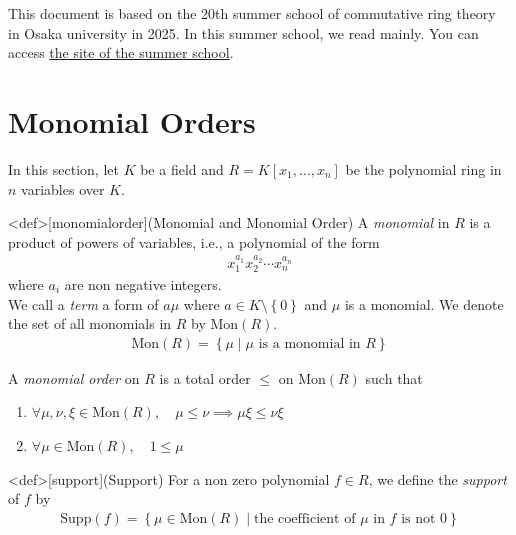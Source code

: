 \documentclass{article}
\renewcommand{\mid}{\middle|}
\begin{document}
This document is based on the 20th summer school of commutative ring theory in Osaka university in 2025. In this summer school, we read \cite{Bruns2022} mainly. You can access \href{https://sites.google.com/view/comm-ring-summer-school-2025/%E3%83%9B%E3%83%BC%E3%83%A0?authuser=0}{the site of the summer school}. 

\newpage

\section{Monomial Orders}
In this section, let $K$ be a field and $R = K[x_1, \ldots, x_n]$ be the polynomial ring in $n$ variables over $K$.

\begin{statementsp}<def>[monomialorder](Monomial and Monomial Order)
    A \textit{monomial} in $R$ is a product of powers of variables, i.e., a polynomial of the form
    \begin{align}
        x_1^{a_1} x_2^{a_2} \cdots x_n^{a_n}
    \end{align}
    where $a_i$ are non negative integers. \\ 
    We call a \textit{term} a form of $a \mu$ where $a \in K \setminus \left\{ 0 \right\}$ and $\mu$ is a monomial. We denote the set of all monomials in $R$ by $\mathrm{Mon}(R)$. 
    \begin{align}
        \mathrm{Mon}(R) = \left\{ \mu \mid \mu \text{ is a monomial in } R \right\}
    \end{align}

    A \textit{monomial order} on $R$ is a total order $\leq$ on $\mathrm{Mon}(R)$ such that 
    \begin{enumerate}
        \item $\forall \mu, \nu, \xi \in \mathrm{Mon}(R), \quad \mu \leq \nu \implies \mu \xi \leq \nu \xi$
        \item $\forall \mu \in \mathrm{Mon}(R), \quad 1 \leq \mu$
    \end{enumerate}
\end{statementsp}

\begin{statementsp}<def>[support](Support)
    For a non zero polynomial $f \in R$, we define the \textit{support} of $f$ by
    \begin{align}
        \mathrm{Supp}(f) = \left\{ \mu \in \mathrm{Mon}(R) \mid \text{the coefficient of } \mu \text{ in } f \text{ is not } 0 \right\}
    \end{align}
\end{statementsp}
\end{document}
